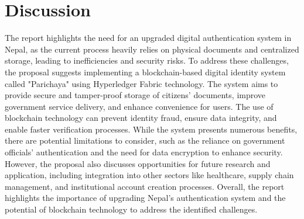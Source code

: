 \section{Discussion}
The report highlights the need for an upgraded digital authentication system in Nepal, as the current process heavily relies on physical documents and centralized storage, leading to inefficiencies and security risks. To address these challenges, the proposal suggests implementing a blockchain-based digital identity system called "Parichaya" using Hyperledger Fabric technology. The system aims to provide secure and tamper-proof storage of citizens' documents, improve government service delivery, and enhance convenience for users. The use of blockchain technology can prevent identity fraud, ensure data integrity, and enable faster verification processes. While the system presents numerous benefits, there are potential limitations to consider, such as the reliance on government officials' authentication and the need for data encryption to enhance security. However, the proposal also discusses opportunities for future research and application, including integration into other sectors like healthcare, supply chain management, and institutional account creation processes. Overall, the report highlights the importance of upgrading Nepal's authentication system and the potential of blockchain technology to address the identified challenges.

      


